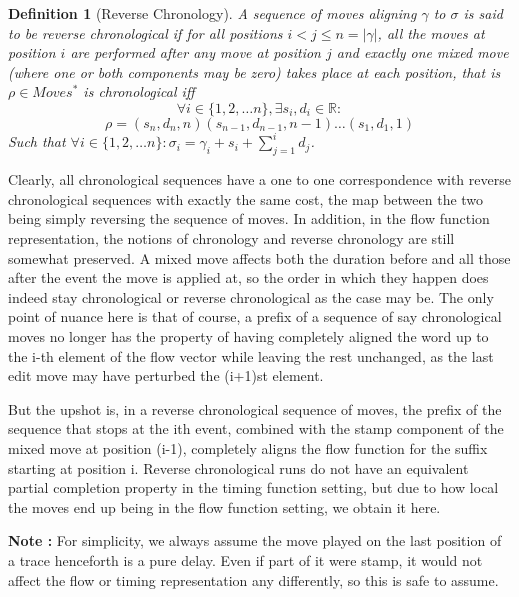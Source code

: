 \documentclass[conference]{IEEEtran}
\newtheorem{definition}{Definition}
\begin{document}
	\begin{definition}[Reverse Chronology]
		A sequence of moves aligning $\gamma$ to $\sigma$ is said to be \textit{reverse chronological} if for all positions $i < j \leq n = |\gamma|$, all the moves at position $i$ are performed after any move at position $j$ and exactly one mixed move (where one or both components may be zero) takes place at each position, that is $\rho \in Moves^*$ is chronological iff  $$\forall i \in \{1, 2, \dots n\},  \exists s_i, d_i \in \mathbb{R} : $$$$ \rho = (s_n, d_n, n)(s_{n-1}, d_{n-1}, n-1)\dots (s_1, d_1, 1) $$
		Such that $\forall i \in \{1, 2, \dots n\} : \sigma_i = \gamma_i + s_i + \sum_{j=1}^{i} d_j$. 
	\end{definition}
	
	Clearly, all chronological sequences have a one to one correspondence with reverse chronological sequences with exactly the same cost, the map between the two being simply reversing the sequence of moves. 
	In addition, in the flow function representation, the notions of chronology and reverse chronology are still somewhat preserved. 
	A mixed move affects both the duration before and all those after the event the move is applied at, so the order in which they happen does indeed stay chronological or reverse chronological as the case may be. 
	The only point of nuance here is that of course, a prefix of a sequence of say chronological moves no longer has the property of having completely aligned the word up to the i-th element of the flow vector while leaving the rest unchanged, as the last edit move may have perturbed the (i+1)st element. 
	
	But the upshot is, in a reverse chronological sequence of moves, the prefix of the sequence that stops at the ith event, combined with the stamp component of the mixed move at position (i-1), completely aligns the flow function for the suffix starting at position i. 
	Reverse chronological runs do not have an equivalent partial completion property in the timing function setting, but due to how local the moves end up being in the flow function setting, we obtain it here. 
	
	\textbf{Note : } For simplicity, we always assume the move played on the last position of a trace henceforth is a pure delay. Even if part of it were stamp, it would not affect the flow or timing representation any differently, so this is safe to assume. 
	
\end{document}
